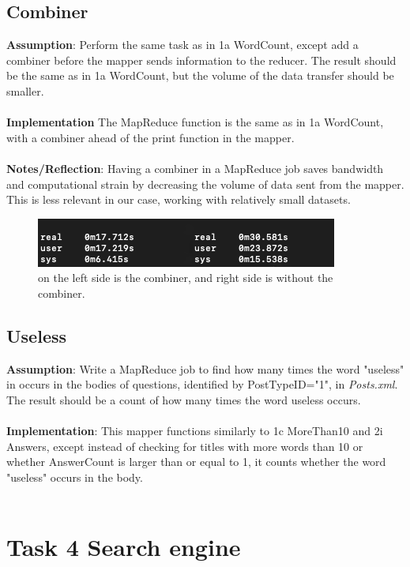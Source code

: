 \documentclass[fleqn,10pt]{wlscirep}
\begin{document}
\subsection{Combiner}
\textbf{Assumption}: Perform the same task as in 1a WordCount, except add a combiner before the mapper sends information to the reducer. The result should be the same as in 1a WordCount, but the volume of the data transfer should be smaller. \\ \\
\textbf{Implementation} The MapReduce function is the same as in 1a WordCount, with a combiner ahead of the print function in the mapper. \\ \\
\textbf{Notes/Reflection}: Having a combiner in a MapReduce job saves bandwidth and computational strain by decreasing the volume of data sent from the mapper. This is less relevant in our case, working with relatively small datasets.


\begin{figure}[H]
\centering
\includegraphics[width=0.5\linewidth]{images/time.png}
\caption{on the left side is the combiner, and right side is without the combiner. }
\label{fig:figure_label}
\end{figure}

\subsection{Useless}
\textbf{Assumption}: Write a MapReduce job to find how many times the word "useless" in occurs in the bodies of questions, identified by PostTypeID="1", in \textit{Posts.xml}. The result should be a count of how many times the word useless occurs. \\ \\
\textbf{Implementation}: This mapper functions similarly to 1c MoreThan10 and 2i Answers, except instead of checking for titles with more words than 10 or whether AnswerCount is larger than or equal to 1, it counts whether the word "useless" occurs in the body. \\ \\



\section{Task 4 Search engine}
\end{document}
